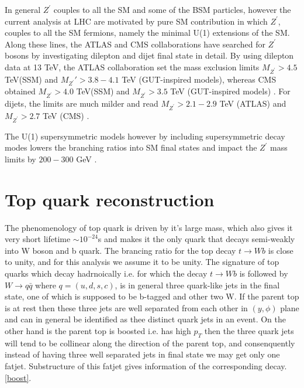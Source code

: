 \documentclass[12pt,a4paper]{article}		%
\begin{document}
\newpage  

	In general $Z^\prime$ couples to all the SM and some of the BSM particles, however the current analysis at LHC are motivated by pure SM contribution in which $Z^\prime$, couples to all the SM fermions, namely the minimal U(1) extensions of the SM. Along these lines, the ATLAS and CMS collaborations have searched for $Z^\prime$ bosons by investigating dilepton and dijet final state in detail. By using dilepton data at 13 TeV, the ATLAS collaboration \cite{atlas} set the mass exclusion limits $M_{Z^\prime}>4.5$ TeV(SSM) and $M_{Z^\prime}′>3.8-4.1 $ TeV (GUT-inspired models), whereas CMS obtained $M_{Z^\prime}>4.0 $ TeV(SSM) and $M_{Z^\prime}>3.5$ TeV (GUT-inspired models) \cite{cms}.  For dijets,  the limits are much milder and read $M_{Z^\prime} > 2.1-2.9$ TeV (ATLAS) \cite{atlasjet} and $M_{Z^\prime} >2.7$ TeV (CMS) \cite{cmsjet}.
	
	The U(1) supersymmetric models however by including supersymmetric decay modes lowers the branching ratios into SM final states and impact the $Z^\prime$ mass limits by $200-300$ GeV \cite{zsusy}. 

\newpage

\section{Top quark reconstruction}

The phenomenology of top quark is driven by it's large mass, which also gives it very short lifetime $\sim 10^{-24}$s and makes it the only quark that decays semi-weakly into W boson and b quark. The brancing ratio for the top decay $t \to W b $ is close to unity, and for this analysis we assume it to be unity. The signature of top quarks which decay hadrnoically i.e. for which the decay $t \to W b $ is followed by $W \to q \bar{q}$ where $q = (u, d, s, c)$, is in general three quark-like jets in the final state, one of which is supposed to be b-tagged and other two W. If the parent top is at rest then these three jets are well separated from each other in $(y,\phi)$ plane and can in general be identified as thee distinct quark jets in an event. On the other hand is the parent top is boosted i.e. has high $p_T$ then the three quark jets will tend to be collinear along the direction of the parent top, and consenquently instead of having three well separated jets in final state we may get only one  fatjet. Substructure of this fatjet gives information of the corresponding decay. \ref{boost}.     
\end{document}
